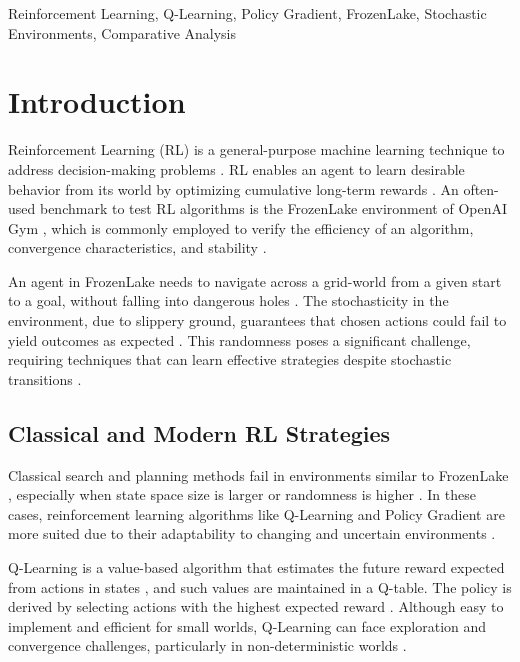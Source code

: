 \documentclass[conference]{IEEEtran}
\begin{document}
\begin{IEEEkeywords}
Reinforcement Learning, Q-Learning, Policy Gradient, FrozenLake, Stochastic Environments, Comparative Analysis
\end{IEEEkeywords}

\section{Introduction}
Reinforcement Learning (RL) is a general-purpose machine learning technique to address decision-making problems \cite{SuttonBarto2018}. RL enables an agent to learn desirable behavior from its world by optimizing cumulative long-term rewards \cite{Mnih2015}. An often-used benchmark to test RL algorithms is the FrozenLake environment of OpenAI Gym \cite{Brockman2016}, which is commonly employed to verify the efficiency of an algorithm, convergence characteristics, and stability \cite{Henderson2018}.

An agent in FrozenLake needs to navigate across a grid-world from a given start to a goal, without falling into dangerous holes \cite{Brockman2016}. The stochasticity in the environment, due to slippery ground, guarantees that chosen actions could fail to yield outcomes as expected \cite{SuttonBarto2018}. This randomness poses a significant challenge, requiring techniques that can learn effective strategies despite stochastic transitions \cite{Littman1996}.

\subsection{Classical and Modern RL Strategies}
Classical search and planning methods fail in environments similar to FrozenLake \cite{Melo2001}, especially when state space size is larger or randomness is higher \cite{Ernst2005}. In these cases, reinforcement learning algorithms like Q-Learning \cite{Watkins1992} and Policy Gradient \cite{Williams1992} are more suited due to their adaptability to changing and uncertain environments \cite{Degris2012}.

Q-Learning is a value-based algorithm that estimates the future reward expected from actions in states \cite{Watkins1992}, and such values are maintained in a Q-table. The policy is derived by selecting actions with the highest expected reward \cite{Melo2001}. Although easy to implement and efficient for small worlds, Q-Learning can face exploration and convergence challenges, particularly in non-deterministic worlds \cite{Thomas2016}.
\end{document}

